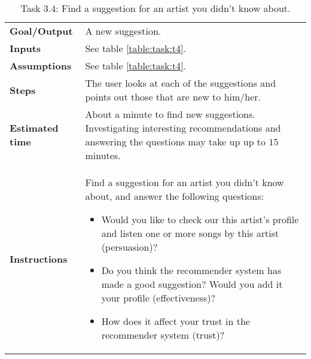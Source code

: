 \begin{table}
	\caption{Task 3.4: Find a suggestion for an artist you didn't know about.}
	\begin{tabular}{ p{80px} | p{350px} }
		\hline
		\textbf{Goal/Output}			& A new suggestion. \\
		\textbf{Inputs}						& See table \ref{table:task:t4}. \\
		\textbf{Assumptions}			& See table \ref{table:task:t4}. \\
		\textbf{Steps}						& The user looks at each of the suggestions and points out those that are new to him/her. \\
		\textbf{Estimated time} 	& About a minute to find new suggestions. Investigating interesting recommendations and answering the questions may take up up to $15$ minutes. \\
		\textbf{Instructions}			&
		Find a suggestion for an artist you didn't know about, and answer the following questions:
		\begin{itemize}
			\item Would you like to check our this artist's profile and listen one or more songs by this artist (persuasion)?
			\item Do you think the recommender system has made a good suggestion? Would you add it your profile (effectiveness)?
			\item How does it affect your trust in the recommender system (trust)?
		\end{itemize}
		\\
		\hline
	\end{tabular}
	\label{table:task:t10}
\end{table}


